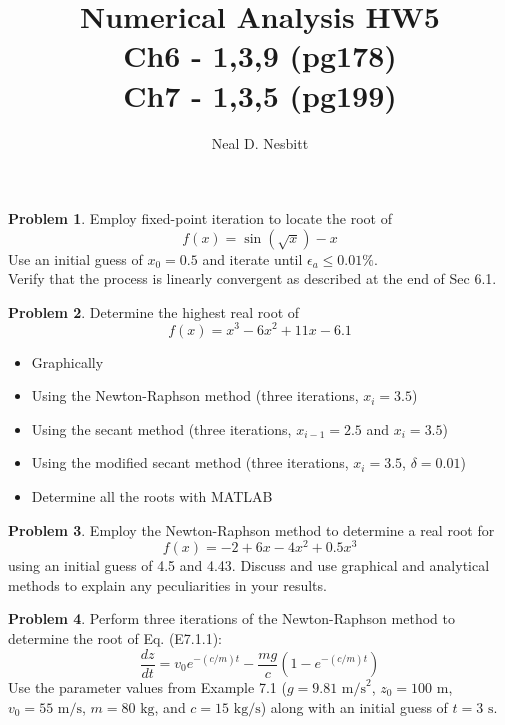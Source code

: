 \documentclass{article}
\title{Numerical Analysis HW5\\
Ch6 - 1,3,9 (pg178)\\
Ch7 - 1,3,5 (pg199)\\}
\author{Neal D. Nesbitt}
\begin{document}
\maketitle

\theoremstyle{definition}
\newtheorem{problem}{Problem}

		
\begin{problem}
	Employ fixed-point iteration to locate the root of
	\[ f(x) = \sin\left(\sqrt{x}\right)-x \]
	Use an initial guess of $x_{0}=0.5$ and iterate until $\epsilon_{a}\le 0.01\%$.\\
	Verify that the process is linearly convergent as described at the end of Sec 6.1.	
\end{problem}

\setcounter{problem}{2}
\begin{problem}
Determine the highest real root of
\[ f(x) = x^{3} - 6x^{2} + 11x - 6.1 \]
\begin{itemize}
\item Graphically
\item Using the Newton-Raphson method (three iterations, $x_{i}=3.5$)
\item Using the secant method (three iterations, $x_{i-1}=2.5$ and $x_{i}=3.5$)
\item Using the modified secant method (three iterations, $x_{i}=3.5$, $\delta = 0.01$)
\item Determine all the roots with MATLAB
\end{itemize}
\end{problem}

\setcounter{problem}{8}
\begin{problem}
Employ the Newton-Raphson method to determine a real root for
\[ f(x) = -2 + 6x - 4x^{2} + 0.5x^{3} \]
using an initial guess of 4.5 and 4.43. Discuss and use graphical and analytical methods to explain any peculiarities in your results.
\end{problem}

\setcounter{problem}{0}
\begin{problem}
Perform three iterations of the Newton-Raphson method to determine the root of Eq. (E7.1.1):
\[ \frac{dz}{dt} = v_{0}e^{-(c/m)t} - \frac{mg}{c}\left( 1 - e^{-(c/m)t} \right)\]
Use the parameter values from Example 7.1 ($g = 9.81 \text{ m/s}^{2}$, $z_{0} = 100 \text{ m}$, $v_{0} = 55 \text{ m/s}$, $m = 80 \text{ kg}$, and $c = 15 \text{ kg/s}$) along with an initial guess of $t = 3 \text{ s}$.
\end{problem}
\end{document}
